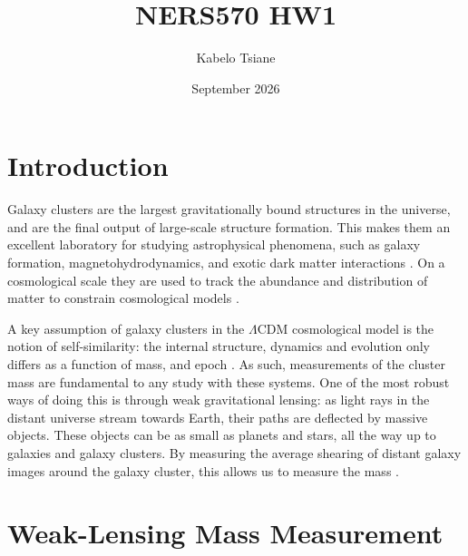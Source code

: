 \documentclass{article}
\title{\vspace{-2em}NERS570 HW1}
\author{Kabelo Tsiane}
\date{September 2026}
\begin{document}
\maketitle

\section{Introduction}

Galaxy clusters are the largest gravitationally bound structures in the universe, and are the final output of large-scale structure formation. This makes them an excellent laboratory for studying astrophysical phenomena, such as galaxy formation, magnetohydrodynamics, and exotic dark matter interactions \citep{kravtsov_formation_2012}. On a cosmological scale they are used to track the abundance and distribution of matter to constrain cosmological models \citep{allen_cosmological_2011}.

A key assumption of galaxy clusters in the $\Lambda\mathrm{CDM}$ cosmological model is the notion of self-similarity: the internal structure, dynamics and evolution only differs as a function of mass, and epoch \citep{kravtsov_formation_2012}. As such, measurements of the cluster mass are fundamental to any study with these systems. One of the most robust ways of doing this is through weak gravitational lensing: as light rays in the distant universe stream towards Earth, their paths are deflected by massive objects. These objects can be as small as planets and stars, all the way up to galaxies and galaxy clusters. By measuring the average shearing of distant galaxy images around the galaxy cluster, this allows us to measure the mass \citep{bartelmann_weak_2001,schneider_gravitational_2006}.

\section{Weak-Lensing Mass Measurement}
\end{document}

